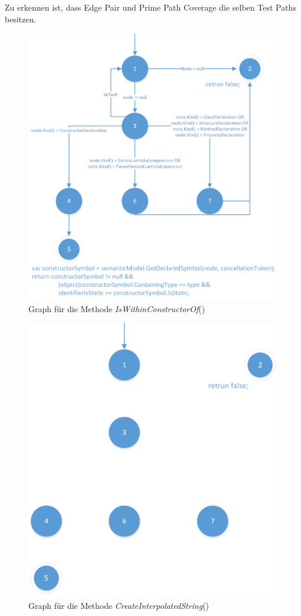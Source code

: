 Zu erkennen ist, dass Edge Pair und Prime Path Coverage die selben Test Paths besitzen. 
\begin{figure}[]
	\centering
	\includegraphics[width=\textwidth]{images/GraphIsWithinConstructorOf.png}
	\caption{Graph für die Methode \textit{IsWithinConstructorOf}()}
	\label{fig:graph-constructor}
\end{figure}


\begin{figure}[]
	\centering
	\includegraphics[width=\textwidth]{images/GraphCreateInterpolatedString.png}
	\caption{Graph für die Methode \textit{CreateInterpolatedString}()}
	\label{fig:graph-interpolatedstring}
\end{figure}